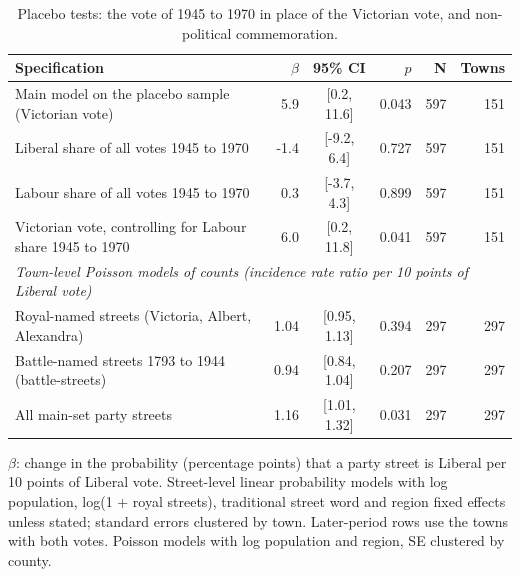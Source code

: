 \documentclass[11pt,a4paper]{article}
\begin{document}
\begin{table}[tbp]\centering\footnotesize\begin{threeparttable}\caption{Placebo tests: the vote of 1945 to 1970 in place of the Victorian vote, and non-political commemoration.}\label{tab:placebo}\begin{tabular}{p{7.2cm}rcrrr}\toprule Specification & $\beta$ & 95\% CI & $p$ & N & Towns\\\midrule
Main model on the placebo sample (Victorian vote) & 5.9 & [0.2, 11.6] & 0.043 & 597 & 151\\
Liberal share of all votes 1945 to 1970 & -1.4 & [-9.2, 6.4] & 0.727 & 597 & 151\\
Labour share of all votes 1945 to 1970 & 0.3 & [-3.7, 4.3] & 0.899 & 597 & 151\\
Victorian vote, controlling for Labour share 1945 to 1970 & 6.0 & [0.2, 11.8] & 0.041 & 597 & 151\\
\midrule\multicolumn{6}{l}{\textit{Town-level Poisson models of counts (incidence rate ratio per 10 points of Liberal vote)}}\\
Royal-named streets (Victoria, Albert, Alexandra) & 1.04 & [0.95, 1.13] & 0.394 & 297 & 297\\
Battle-named streets 1793 to 1944 (battle-streets) & 0.94 & [0.84, 1.04] & 0.207 & 297 & 297\\
All main-set party streets & 1.16 & [1.01, 1.32] & 0.031 & 297 & 297\\
\bottomrule\end{tabular}\begin{tablenotes}\footnotesize\item $\beta$: change in the probability (percentage points) that a party street is Liberal per 10 points of Liberal vote. Street-level linear probability models with log population, log(1 + royal streets), traditional street word and region fixed effects unless stated; standard errors clustered by town. Later-period rows use the towns with both votes. Poisson models with log population and region, SE clustered by county.\end{tablenotes}\end{threeparttable}\end{table}
\end{document}
